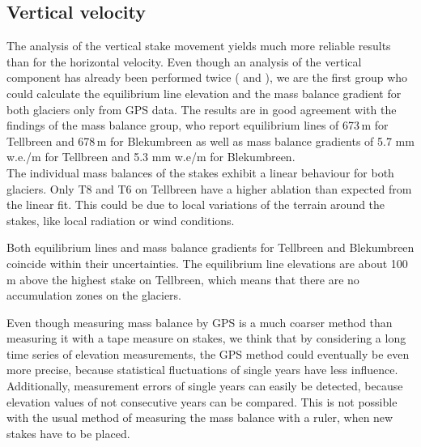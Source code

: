\subsection{Vertical velocity}

The analysis of the vertical stake movement yields much more reliable results than for the horizontal velocity.
Even though an analysis of the vertical component has already been performed twice
(\cite{rep2016} and \cite{rep2017}),
we are the first group who could calculate the equilibrium line elevation and the mass balance gradient for
both glaciers only from GPS data.
The results are in good agreement with the findings of the mass balance group, who report equilibrium lines of
673\,m for Tellbreen and 678\,m for Blekumbreen as well as
mass balance gradients of 5.7 mm w.e./m for Tellbreen and 5.3 mm w.e/m for Blekumbreen.\\
The individual mass balances of the stakes exhibit a linear behaviour for both glaciers.
Only T8 and T6 on Tellbreen have a higher ablation than expected from the linear fit.
This could be due to local variations of the terrain around the stakes,
like local radiation or wind conditions.

Both equilibrium lines and mass balance gradients for Tellbreen and Blekumbreen coincide within their uncertainties.
The equilibrium line elevations are about 100\,m above the highest stake on Tellbreen,
which means that there are no accumulation zones on the glaciers.

Even though measuring mass balance by GPS is a much coarser method than measuring it with a tape measure on stakes,
we think that by considering a long time series of elevation measurements,
the GPS method could eventually be even more precise,
because statistical fluctuations of single years have less influence.
Additionally, measurement errors of single years can easily be detected,
because elevation values of not consecutive years can be compared.
This is not possible with the usual method of measuring the mass balance with a ruler,
when new stakes have to be placed.

